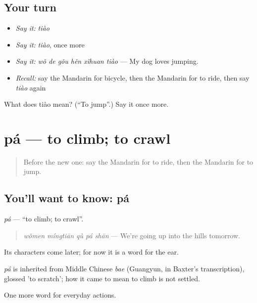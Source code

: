\subsection*{Your turn}
\begin{itemize}
\raggedright
  \item \emph{Say it:} \emph{tiào}
  \item \emph{Say it:} \emph{tiào}, once more
  \item \emph{Say it:} \emph{wǒ de gǒu hěn xǐhuan tiào} — My dog loves jumping.
  \item \emph{Recall:} say the Mandarin for bicycle, then the Mandarin for to ride, then say \emph{tiào} again
\end{itemize}

\begin{tcolorbox}[breakable,colback=teal!4,colframe=teal!35!black,title={Before you move on}]
What does tiào mean? (\textquotedblleft{}To jump\textquotedblright{}.) Say it once more.
\end{tcolorbox}
\section[pá]{pá — to climb; to crawl}

\label{lesson:ZH-C107-pa-climb}



\begin{quote}
Before the new one: say the Mandarin for to ride, then the Mandarin for to jump.
\end{quote}

\subsection*{You'll want to know: pá}
\emph{pá} — \textquotedblleft{}to climb; to crawl\textquotedblright{}.

\begin{quote}
\emph{wǒmen míngtiān qù pá shān} — We're going up into the hills tomorrow.
\end{quote}

Its characters come later; for now it is a word for the ear.

\begin{cousinweb}
\emph{pá} is inherited from Middle Chinese \emph{bae} (Guangyun, in Baxter's transcription), glossed 'to scratch'; how it came to mean to climb is not settled.
\end{cousinweb}

\begin{grammarlens}[title={What you've built}]
One more word for everyday actions.
\end{grammarlens}

